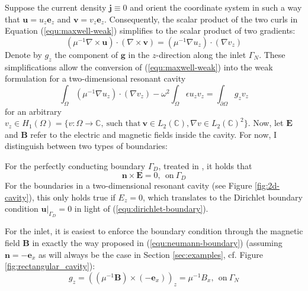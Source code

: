 \documentclass[11pt, a4paper]{article}
\begin{document}
Suppose the current density $\mathbf{j} \equiv 0$ and orient the coordinate
system in such a way that $\mathbf{u} = u_z \mathbf{e}_z$ and 
$\mathbf{v} = v_z \mathbf{e}_z$. Consequently, the scalar product of the two 
curls in Equation (\ref{equ:maxwell-weak}) simplifies to the scalar product 
of two gradients:
\begin{equation}
    (\mu^{-1} \nabla \times \mathbf{u}) \cdot (\nabla \times \mathbf{v})
    = (\mu^{-1} \nabla u_z) \cdot (\nabla v_z)
\end{equation}
Denote by $g_z$ the component of $\mathbf{g}$ in the $z$-direction along the
inlet $\Gamma_N$. These simplifications allow the conversion of 
(\ref{equ:maxwell-weak}) into the weak formulation for a two-dimensional
resonant cavity
\begin{equation}
    \int_{\Omega} (\mu^{-1} \nabla u_z) \cdot (\nabla v_z)
    - \omega^2 \int_{\Omega} \epsilon u_z v_z
    = \int_{\partial \Omega} g_z v_z \label{equ:maxwell-weak-resonant-cavity}
\end{equation}
for an arbitrary $v_z \in H_1(\Omega) = \{v : \Omega \to \mathbb{C},~\text{such that}~\mathbf{v}\in L_2(\mathbb{C}), \nabla v \in L_2(\mathbb{C})^2\}$.
Now, let $\mathbf{E}$ and $\mathbf{B}$ refer to the electric and magnetic fields inside
the cavity. For now, I distinguish between two types of boundaries:

For the perfectly conducting boundary $\Gamma_D$, treated in \citep{monk}, it holds that
\begin{equation}
    \mathbf{n} \times \mathbf{E} = 0,~~\text{on}~\Gamma_D \label{equ:perfect-conductor-boundary}
\end{equation}
For the boundaries in a two-dimensional resonant cavity (see Figure 
\ref{fig:2d-cavity}), this only holds true if $E_z = 0$, which translates
to the Dirichlet boundary condition $\left.\mathbf{u}\right|_{\Gamma_D} = 0$
in light of (\ref{equ:dirichlet-boundary}).

For the inlet, it is easiest to enforce the boundary condition through the
magnetic field $\mathbf{B}$ in exactly the way proposed in
(\ref{equ:neumann-boundary}) (assuming $\mathbf{n} = -\mathbf{e}_x$ as
will always be the case in Section \ref{sec:examples}, cf. Figure \ref{fig:rectangular_cavity}):
\begin{equation}
    g_z = (({\mu^{-1} \mathbf{B}}) \times (-\mathbf{e}_x))_z = \mu^{-1} B_x,~~\text{on}~\Gamma_N
\end{equation}
\end{document}
